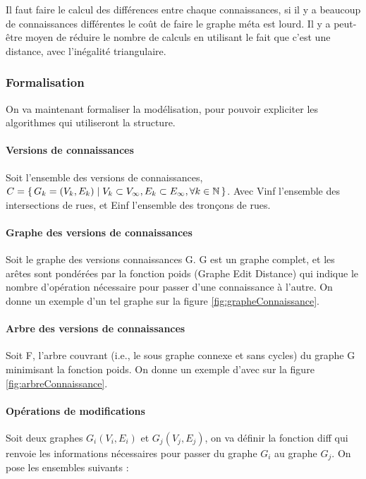 \documentclass[a4paper]{article}
\newcommand{\N}{\mathbb{N}}
\begin{document}
Il faut faire le calcul des différences entre chaque connaissances, si il y a
beaucoup de connaissances différentes le coût de faire le graphe méta est lourd.
Il y a peut-être moyen de réduire le nombre de calculs en utilisant le fait que
c'est une distance, avec l'inégalité triangulaire.

    \subsubsection{Formalisation}

On va maintenant formaliser la modélisation, pour pouvoir expliciter les
algorithmes qui utiliseront la structure.

\paragraph{Versions de connaissances} Soit l'ensemble des versions de
connaissances, $C = \set{G_k = (V_k, E_k) | V_k \subset V_\infty, E_k \subset
E_\infty, \forall k \in \N}$. Avec \gls{Vinf} l'ensemble des intersections de
rues, et \gls{Einf} l'ensemble des tronçons de rues.

\paragraph{Graphe des versions de connaissances} Soit le graphe des versions
connaissances \gls{G}. \gls{G} est un graphe complet, et les arêtes sont
pondérées par la fonction \gls{poids} (Graphe Edit Distance) qui indique le
nombre d'opération nécessaire pour passer d'une connaissance à l'autre. On donne
un exemple d'un tel graphe sur la figure \ref{fig:grapheConnaissance}.

\paragraph{Arbre des versions de connaissances} Soit \gls{F}, l'arbre couvrant
(i.e., le sous graphe connexe et sans cycles) du graphe \gls{G} minimisant la
fonction \gls{poids}. On donne un exemple d'\gls{avec} sur la figure
\ref{fig:arbreConnaissance}.

\paragraph{Opérations de modifications} Soit deux graphes $G_i(V_i, E_i)$ et
$G_j(V_j, E_j)$, on va définir la fonction \gls{diff} qui renvoie les
informations nécessaires pour passer du graphe $G_i$ au graphe $G_j$. On pose
les ensembles suivants :
\end{document}
